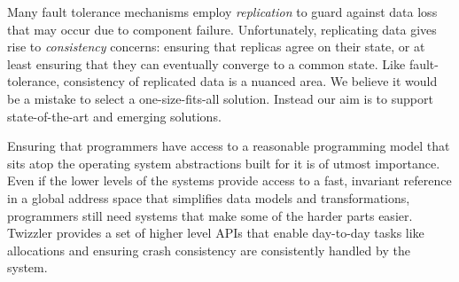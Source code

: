     Many fault tolerance mechanisms employ \emph{replication} to guard against data loss that may occur
    due to component failure.
    Unfortunately, replicating data gives rise to \emph{consistency} concerns: ensuring that replicas agree on their state,
    or at least ensuring that they can eventually converge to a common state.  Like fault-tolerance, consistency of replicated data
    is a nuanced area.  We believe it would be a mistake to select a one-size-fits-all solution.  Instead our aim is to support
    state-of-the-art and emerging solutions.

\fi



\begin{chconc}
    Ensuring that programmers have access to a reasonable programming model that sits atop the operating system
    abstractions built for it is of utmost importance. Even if the lower levels of the systems provide access to a fast,
    invariant reference in a global address space that simplifies data models and transformations, programmers still
    need systems that make some of the harder parts easier. Twizzler provides a set of higher level APIs that enable
    day-to-day tasks like allocations and ensuring crash consistency are consistently handled by the system.
\end{chconc}


